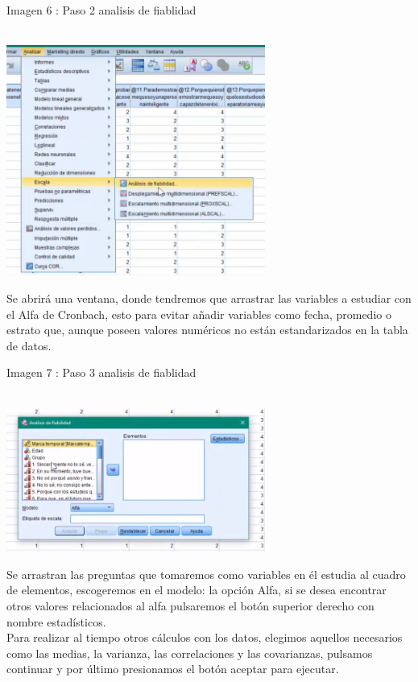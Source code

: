 \documentclass[conference]{IEEEtran}
\begin{document}
\begin{center}
\caption{Imagen 6 : Paso 2 analisis de fiablidad}\\
\includegraphics[width=8.5cm]{imagenes/Paso4}
\end{center}
      Se abrirá una ventana, donde tendremos que arrastrar las variables a estudiar con el Alfa de Cronbach, esto para evitar añadir variables como fecha, promedio o estrato que, aunque poseen valores numéricos no están estandarizados en la tabla de datos. \\

\begin{center}
\caption{Imagen 7 : Paso  3 analisis de fiablidad}\\
\includegraphics[width=8.5cm]{imagenes/Paso6.png}
\end{center}
Se arrastran las preguntas que tomaremos como variables en él estudia al cuadro de elementos, escogeremos en el modelo: la opción Alfa, si se desea encontrar otros valores relacionados al alfa pulsaremos el botón superior derecho con nombre estadísticos.\\

Para realizar al tiempo otros cálculos con los datos, elegimos aquellos necesarios como las medias, la varianza, las correlaciones y las covarianzas, pulsamos continuar y por último presionamos el botón aceptar para ejecutar.\\
\end{document}
